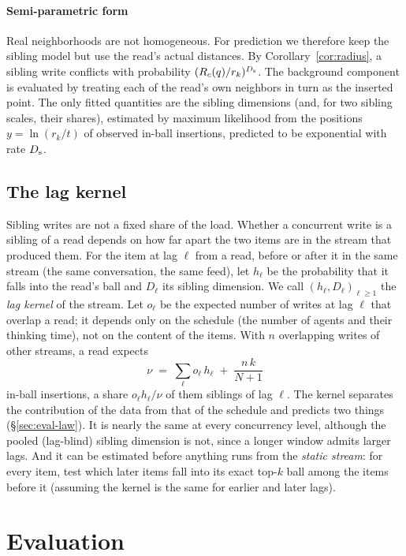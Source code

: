 \documentclass[sigconf, nonacm, review]{acmart}
\begin{document}
\paragraph{Semi-parametric form}
Real neighborhoods are not homogeneous. For prediction we therefore
keep the sibling model but use the read's actual distances. By
Corollary~\ref{cor:radius}, a sibling write conflicts with probability
$(R_c(q)/r_k)^{D_{\mathrm{s}}}$. The background component is evaluated by treating
each of the read's own neighbors in turn as the inserted point. The
only fitted quantities are the sibling dimensions (and, for two
sibling scales, their shares), estimated by maximum likelihood from the
positions $y=\ln(r_k/t)$ of observed in-ball insertions, predicted
to be exponential with rate $D_{\mathrm{s}}$.

\subsection{The lag kernel}
\label{sec:kernel}

Sibling writes are not a fixed share of the load. Whether a concurrent
write is a sibling of a read depends on how far apart the two items are
in the stream that produced them. For the item at lag $\ell$ from a
read, before or after it in the same stream (the same conversation, the same feed), let
$h_\ell$ be the probability that it falls into the read's ball and
$D_\ell$ its sibling dimension. We call $(h_\ell,D_\ell)_{\ell\ge1}$
the \emph{lag kernel} of the stream. Let $o_\ell$ be the expected number
of writes at lag $\ell$ that overlap a read; it depends only on the
schedule (the number of agents and their thinking time), not on the
content of the items. With $n$ overlapping writes of other streams, a
read expects
\[
\nu \;=\; \sum_{\ell} o_\ell\,h_\ell \;+\; \frac{n\,k}{N+1}
\]
in-ball insertions, a share $o_\ell h_\ell/\nu$ of them siblings
of lag $\ell$. The kernel separates the contribution of the data from that of the
schedule and predicts two things (\S\ref{sec:eval-law}). It is nearly
the same at every concurrency level, although the pooled (lag-blind) sibling
dimension is not, since a longer window admits larger lags. And it can be estimated
before anything runs from the \emph{static stream}: for every item, test which
later items fall into its exact top-$k$ ball among the items before it
(assuming the kernel is the same for earlier and later lags).

\section{Evaluation}
\label{sec:eval}
\end{document}
